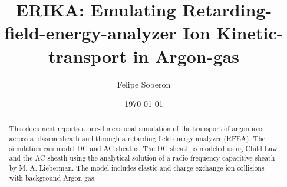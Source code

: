 \documentclass[%
 aapm,
 mph,%
 amsmath,amssymb,
 reprint,%
]{revtex4-2}
\begin{document}

\title[Ion transport in a retarding field energy analyzer]{ERIKA: Emulating Retarding-field-energy-analyzer Ion Kinetic-transport in Argon-gas}

\author{Felipe Soberon}

\date{\today}

\begin{abstract}
This document reports a one-dimensional simulation of the transport of argon ions across a plasma sheath and through a
retarding field energy analyzer (RFEA). The simulation can model DC and AC sheaths. The DC sheath is modeled using Child Law
and the AC sheath using the analytical solution of a radio-frequency capacitive sheath by M. A. Lieberman. The model includes
elastic and charge exchange ion collisions with background Argon gas. 
\end{abstract}

\maketitle

 




\nocite{*}

\end{document}
